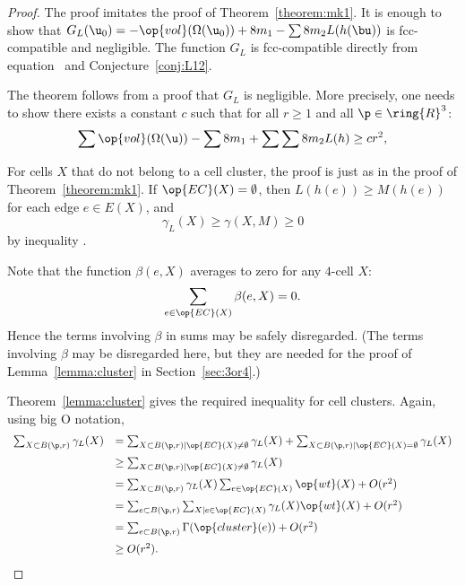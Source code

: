 \begin{proof} The proof imitates the proof of
Theorem~\ref{theorem:mk1}.  It is enough to show that $G_L( \u_0) =
-\op{vol}(\Omega( \u_0)) + 8 m_1 - \sum 8 m_2 L(h(\bu))$ is
fcc-compatible and negligible.  The function $G_L$ is fcc-compatible
directly from equation~ and Conjecture~\ref{conj:L12}.

The theorem follows from a proof that $G_L$ is negligible.  More
precisely, one needs to show there exists a constant $c$ such that
for all $r\ge 1$ and all $\p\in\ring{R}^3$:
\begin{equation}\label{eqn:A2neg}
\sum \op{vol}(\Omega( \u)) -\sum 8m_1 + \sum \sum 8 m_2 L(h) \ge c r^2,
\end{equation}

For cells $X$ that do not belong to a cell cluster,
the proof is just as in the proof of Theorem~\ref{theorem:mk1}.
If $\op{EC}(X)=\emptyset$, then 
$L(h(e))\ge M(h(e))$ for each edge $e\in E(X)$, and
\begin{displaymath}\gamma_L(X)\ge \gamma(X,M)\ge 0\end{displaymath} 
by inequality .

Note that the function $\beta(e,X)$ averages to zero for any $4$-cell $X$:
\begin{displaymath}
\sum_{e\in \op{EC}(X)} \beta(e,X) = 0.
\end{displaymath}
Hence the terms involving $\beta$ in sums may be safely disregarded.
(The terms involving $\beta$ may be disregarded here, but they are
needed for the proof of Lemma~\ref{lemma:cluster} in
Section~\ref{sec:3or4}.)

Theorem~\ref{lemma:cluster} gives the required inequality for cell
clusters.  Again, using big O notation,
\begin{displaymath}
\begin{array}{lll}
\sum_{X\subset B(\p,r)} \gamma_L(X) &= 
\sum_{X\subset B(\p,r)\mid \op{EC}(X)\ne\emptyset} \gamma_L(X) +
\sum_{X\subset B(\p,r)\mid \op{EC}(X)=\emptyset} \gamma_L(X) \vspace{6pt}\\
&\ge \sum_{X\subset B(\p,r)\mid \op{EC}(X)\ne\emptyset} \gamma_L(X)\vspace{6pt} \\
&=\sum_{X\subset B(\p,r)}\gamma_L(X)\sum_{e \in \op{EC}(X)}\op{wt}(X) + O(r^2)\vspace{6pt}\\
&=\sum_{e\subset B(\p,r)}\sum_{X\mid e \in \op{EC}(X)}\gamma_L(X)\op{wt}(X) + O(r^2)\vspace{6pt}\\
&=\sum_{e\subset B(\p,r)}\Gamma(\op{cluster}(e)) + O(r^2)\vspace{6pt}\\
&\ge O(r^2).
\end{array}
\end{displaymath}


\end{proof}
